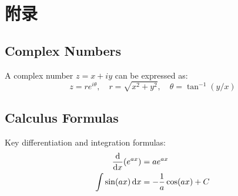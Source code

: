 \chapter{附录}
\section{Complex Numbers}
A complex number $z = x + iy$ can be expressed as:
\begin{equation}
	z = re^{i\theta}, \quad r = \sqrt{x^2 + y^2}, \quad \theta = \tan^{-1}(y/x)
\end{equation}

\section{Calculus Formulas}
Key differentiation and integration formulas:
\begin{align}
	\dv{x}(e^{ax}) &= ae^{ax} \\
	\int \sin(ax) \dd{x} &= -\frac{1}{a} \cos(ax) + C
\end{align}